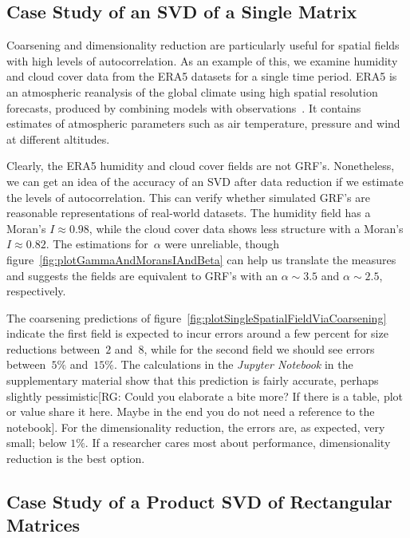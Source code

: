 \documentclass[ijgi,article,submit,moreauthors,pdftex,10pt,a4paper]{Definitions/mdpi}
\begin{document}
\subsection{Case Study of an SVD of a Single Matrix}
\label{sec:Results/Case Study of an SVD of a Single Matrix}

Coarsening and dimensionality reduction are particularly useful for spatial fields with high levels of autocorrelation. As an example of this, we examine humidity and cloud cover data from the ERA5 datasets for a single time period. ERA5 is an atmospheric reanalysis of the global climate using high spatial resolution forecasts, produced by combining models with observations~\cite{Dee2011}. It contains estimates of atmospheric parameters such as air temperature, pressure and wind at different altitudes.

Clearly, the ERA5 humidity and cloud cover fields are not GRF's. Nonetheless, we can get an idea of the accuracy of an SVD after data reduction if we estimate the levels of autocorrelation. This can verify whether simulated GRF's are reasonable representations of real-world datasets. The humidity field has a Moran's $I \approx 0.98$, while the cloud cover data shows less structure with a Moran's $I \approx 0.82$. The estimations for~$\alpha$ were unreliable, though figure~\ref{fig:plotGammaAndMoransIAndBeta} can help us translate the measures and suggests the fields are equivalent to GRF's with an $\alpha \sim 3.5$ and $\alpha \sim 2.5$, respectively.

The coarsening predictions of figure~\ref{fig:plotSingleSpatialFieldViaCoarsening} indicate the first field is expected to incur errors around a few percent for size reductions between~$2$ and~$8$, while for the second field we should see errors between~$5\%$ and~$15\%$. The calculations in the \textit{Jupyter Notebook} in the supplementary material show that this prediction is fairly accurate, perhaps slightly pessimistic[RG: Could you elaborate a bite more? If there is a table, plot or value share it here. Maybe in the end you do not need a reference to the notebook]. For the dimensionality reduction, the errors are, as expected, very small; below $1\%$. If a researcher cares most about performance, dimensionality reduction is the best option.


\subsection{Case Study of a Product SVD of Rectangular Matrices}
\label{sec:Results/Case Study of a Product SVD of Rectangular Matrices}
\end{document}
